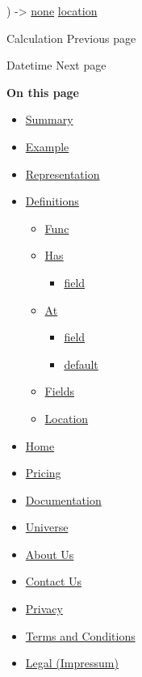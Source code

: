 ) -\textgreater{} \href{/docs/reference/foundations/none/}{none}
\href{/docs/reference/introspection/location/}{location}

\href{/docs/reference/foundations/calc/}{\pandocbounded{}}

{ Calculation } { Previous page }

\href{/docs/reference/foundations/datetime/}{\pandocbounded{}}

{ Datetime } { Next page }

\textbf{On this page}

\begin{itemize}
\tightlist
\item
  \hyperref[summary]{Summary}
\item
  \hyperref[example]{Example}
\item
  \hyperref[representation]{Representation}
\item
  \hyperref[definitions]{Definitions}

  \begin{itemize}
  \tightlist
  \item
    \hyperref[definitions-func]{Func}
  \item
    \hyperref[definitions-has]{Has}

    \begin{itemize}
    \tightlist
    \item
      \hyperref[definitions-has-field]{field}
    \end{itemize}
  \item
    \hyperref[definitions-at]{At}

    \begin{itemize}
    \tightlist
    \item
      \hyperref[definitions-at-field]{field}
    \item
      \hyperref[definitions-at-default]{default}
    \end{itemize}
  \item
    \hyperref[definitions-fields]{Fields}
  \item
    \hyperref[definitions-location]{Location}
  \end{itemize}
\end{itemize}

\begin{itemize}
\tightlist
\item
  \href{/}{Home}
\item
  \href{/pricing/}{Pricing}
\item
  \href{/docs/}{Documentation}
\item
  \href{/universe/}{Universe}
\item
  \href{/about/}{About Us}
\item
  \href{/contact/}{Contact Us}
\item
  \href{/privacy/}{Privacy}
\item
  \href{https://typst.app/terms}{Terms and Conditions}
\item
  \href{/legal/}{Legal (Impressum)}
\end{itemize}

